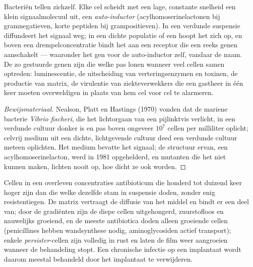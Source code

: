 \begin{proposition}\label{prop:b2:microbial-metabolism:quorum}
Bacteriën tellen zichzelf. Elke cel scheidt met een lage, constante
snelheid een klein signaalmolecuul uit, een \emph{auto-inductor}
(acylhomoserinelactonen bij gramnegatieven, korte peptiden bij
grampositieven). In een verdunde suspensie diffundeert het signaal weg;
in een dichte populatie of een  hoopt het zich op, en boven een
drempelconcentratie bindt het aan een receptor die een reeks genen
aanschakelt --- waaronder het gen voor de auto-inductor zelf, vandaar
de naam. De zo gestuurde genen zijn die welke pas lonen wanneer veel
cellen samen optreden: luminescentie, de uitscheiding van
verteringsenzymen en toxinen, de productie van matrix, de virulentie
van ziekteverwekkers die een gastheer in één keer moeten overweldigen
in plaats van hem cel voor cel te alarmeren.
\end{proposition}
\begin{proof}[Bewijsmateriaal]
Nealson, Platt en Hastings (1970) vonden dat de mariene bacterie
\emph{Vibrio fischeri}, die het lichtorgaan van een pijlinktvis
verlicht, in een verdunde cultuur donker is en pas boven ongeveer
$10^{7}$ cellen per milliliter oplicht; celvrij medium uit een dichte,
lichtgevende cultuur deed een verdunde cultuur meteen oplichten. Het
medium bevatte het signaal; de structuur ervan, een
acylhomoserinelacton, werd in 1981 opgehelderd, en mutanten die het niet
kunnen maken, lichten nooit op, hoe dicht ze ook worden.
\end{proof}

\begin{example}\label{ex:b2:microbial-metabolism:tolerance}
Cellen in een  overleven concentraties antibioticum die honderd
tot duizend keer hoger zijn dan die welke dezelfde stam in suspensie
doden, zonder enig resistentiegen. De matrix vertraagt de diffusie van
het middel en bindt er een deel van; door de gradiënten zijn de diepe
cellen uitgehongerd, zuurstofloos en nauwelijks groeiend, en de meeste
antibiotica doden alleen groeiende cellen (penicillines hebben
wandsynthese nodig, aminoglycosiden actief transport); enkele
\emph{persister}-cellen zijn volledig in rust en laten de film weer
aangroeien wanneer de behandeling stopt. Een chronische infectie op een
implantaat wordt daarom meestal behandeld door het implantaat te
verwijderen.
\end{example}

